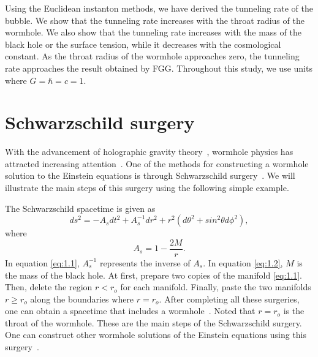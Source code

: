 \documentclass[12pt]{article}
\begin{document}
Using the Euclidean instanton methods, we have derived the tunneling rate of the bubble. We show that the tunneling rate increases with the throat radius of the wormhole. We also show that the tunneling rate increases with the mass of the black hole or the surface tension, while it decreases  with the cosmological constant.  As the throat radius of the wormhole approaches zero, the tunneling rate approaches the result obtained by FGG. Throughout this study, we use units where $G=\hbar=c=1$.





\section{Schwarzschild surgery}
\label{sec:1}
With the advancement of holographic gravity theory~\cite{JM,AK1,AK2,SJ,SS,JV,JD,AS},  wormhole physics has attracted increasing attention~\cite{DAJDS,C1,PD,JX,SEM,ZZ}. One of the methods for constructing a wormhole solution to the Einstein equations is through Schwarzschild surgery~\cite{MV}. We will illustrate the main steps of this surgery using the following simple example.

The Schwarzschild spacetime is given as
\begin{equation}
\label{eq:1.1}%
ds^{2}=-A_{s}dt^{2}+A_{s}^{-1}dr^{2}+r^{2}(d\theta^{2}+sin^{2} \theta d\phi^{2}),
\end{equation}
where
\begin{equation}
\label{eq:1.2}%
A_{s}=1-\frac{2M}{r}.
\end{equation}
In equation \eqref{eq:1.1}, $A_{s}^{-1}$ represents the inverse of $A_{s}$. In equation \eqref{eq:1.2}, $M$ is the mass of the black hole. At first, prepare two copies of the manifold \eqref{eq:1.1}. Then, delete the region $r< r_{o}$ for each manifold. Finally, paste the two manifolds $r\geq r_{o}$ along the boundaries where $r=r_{o}$. After completing all these surgeries, one can obtain a spacetime that includes a wormhole~\cite{MV}. Noted that $r=r_{o}$ is the throat of the wormhole. These are the main steps of the Schwarzschild surgery. One can construct other wormhole solutions of the Einstein equations using this surgery~\cite{SWK,JFS}.
\end{document}
